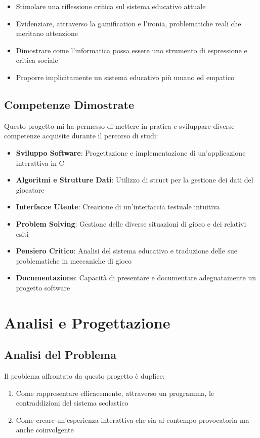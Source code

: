 \documentclass[a4paper,12pt]{article}
\begin{document}
\begin{itemize}
    \item Stimolare una riflessione critica sul sistema educativo attuale
    \item Evidenziare, attraverso la gamification e l'ironia, problematiche reali che meritano attenzione
    \item Dimostrare come l'informatica possa essere uno strumento di espressione e critica sociale
    \item Proporre implicitamente un sistema educativo più umano ed empatico
\end{itemize}

\subsection{Competenze Dimostrate}

Questo progetto mi ha permesso di mettere in pratica e sviluppare diverse competenze acquisite durante il percorso di studi:

\begin{itemize}
    \item \textbf{Sviluppo Software}: Progettazione e implementazione di un'applicazione interattiva in C
    \item \textbf{Algoritmi e Strutture Dati}: Utilizzo di struct per la gestione dei dati del giocatore
    \item \textbf{Interfacce Utente}: Creazione di un'interfaccia testuale intuitiva
    \item \textbf{Problem Solving}: Gestione delle diverse situazioni di gioco e dei relativi esiti
    \item \textbf{Pensiero Critico}: Analisi del sistema educativo e traduzione delle sue problematiche in meccaniche di gioco
    \item \textbf{Documentazione}: Capacità di presentare e documentare adeguatamente un progetto software
\end{itemize}

\section{Analisi e Progettazione}

\subsection{Analisi del Problema}

Il problema affrontato da questo progetto è duplice:
\begin{enumerate}
    \item Come rappresentare efficacemente, attraverso un programma, le contraddizioni del sistema scolastico
    \item Come creare un'esperienza interattiva che sia al contempo provocatoria ma anche coinvolgente
\end{enumerate}
\end{document}
